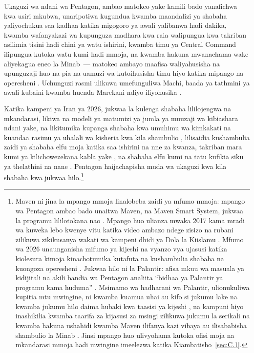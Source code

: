 Ukaguzi wa ndani wa Pentagon, ambao matokeo yake kamili bado yanafichwa kwa usiri mkubwa, unaripotiwa kugundua kwamba maandalizi ya shabaha yaliyochukua saa kadhaa katika migogoro ya awali yalibanwa hadi dakika, kwamba wafanyakazi wa kupunguza madhara kwa raia walipungua kwa takriban asilimia tisini hadi chini ya watu ishirini, kwamba timu ya Central Command ilipungua kutoka watu kumi hadi mmoja, na kwamba hakuna mwanachama wake aliyekagua eneo la Minab~— matokeo ambayo maafisa waliyahusisha na upunguzaji huo na pia na uamuzi wa kutoihusisha timu hiyo katika mipango na operesheni \autocite{Bloomberg2026KillChain}. Uchunguzi rasmi ulikuwa umefunguliwa Machi, baada ya tathmini ya awali kubaini kwamba huenda Marekani ndiyo iliyohusika \autocite{NPR2026MinabProbe}.

Katika kampeni ya Iran ya 2026, jukwaa la kulenga shabaha lililojengwa na mkandarasi, likiwa na modeli ya matumizi ya jumla ya muuzaji wa kibiashara ndani yake, na likitumika kupanga shabaha kwa umuhimu wa kimkakati na kuandaa rasimu ya uhalali wa kisheria kwa kila shambulio \autocite{livingstone2026maven}, lilisaidia kushambulia zaidi ya shabaha elfu moja katika saa ishirini na nne za kwanza, takriban mara kumi ya kilichowezekana kabla yake \autocite{csis2026maven}, na shabaha elfu kumi na tatu kufikia siku ya thelathini na nane \autocite{breakingdefense2026maven}. Pentagon haijachapisha muda wa ukaguzi kwa kila shabaha kwa jukwaa hilo.\footnote{Maven ni jina la mpango mmoja linalobeba zaidi ya mfumo mmoja: mpango wa Pentagon ambao bado unaitwa Maven, na Maven Smart System, jukwaa la programu lililotokana nao \autocite{csis2026maven}. Mpango huo ulianza mwaka 2017 kama mradi wa kuweka lebo kwenye vitu katika video ambazo ndege zisizo na rubani zilikuwa zikikusanya wakati wa kampeni dhidi ya Dola la Kiislamu \autocite{weisgerber2017maven,fang2019maven}. Mfumo wa 2026 unaunganisha mifumo ya kijeshi na vyanzo vya ujasusi katika kiolesura kimoja kinachotumika kutafuta na kushambulia shabaha na kuongoza operesheni \autocite{defensescoop2026transition}. Jukwaa hilo ni la Palantir: afisa mkuu wa masuala ya kidijitali na akili bandia wa Pentagon analiita “bidhaa ya Palantir ya programu kama huduma” \autocite{defensescoop2026transition}. Msimamo wa hadharani wa Palantir, ulionukuliwa kupitia mtu mwingine, ni kwamba kuamua uhai au kifo si jukumu lake na kwamba jukumu hilo daima hubaki kwa taasisi ya kijeshi \autocite{lee2026palantir}, na kampuni hiyo inashikilia kwamba taarifa za kijasusi za msingi zilikuwa jukumu la serikali na kwamba hakuna ushahidi kwamba Maven ilifanya kazi vibaya au ilisababisha shambulio la Minab \autocite{Bloomberg2026KillChain}. Jinsi mpango huo ulivyohama kutoka ofisi moja na mkandarasi mmoja hadi mwingine imeelezwa katika Kiambatisho~\ref{sec:C.1}.}

